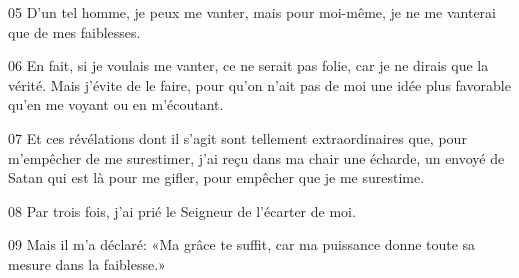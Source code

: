 
05 D’un tel homme, je peux me vanter, mais pour moi-même, je ne me vanterai que de mes faiblesses.

06 En fait, si je voulais me vanter, ce ne serait pas folie, car je ne dirais que la vérité. Mais j’évite de le faire, pour qu’on n’ait pas de moi une idée plus favorable qu’en me voyant ou en m’écoutant.

07 Et ces révélations dont il s’agit sont tellement extraordinaires que, pour m’empêcher de me surestimer, j’ai reçu dans ma chair une écharde, un envoyé de Satan qui est là pour me gifler, pour empêcher que je me surestime.

08 Par trois fois, j’ai prié le Seigneur de l’écarter de moi.

09 Mais il m’a déclaré: «Ma grâce te suffit, car ma puissance donne toute sa mesure dans la faiblesse.» 